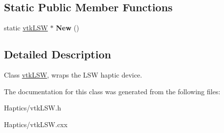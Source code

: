 \subsection*{Static Public Member Functions}
\begin{DoxyCompactItemize}
\item 
\hypertarget{classvtkLSW_a387712b4a9a6247add516701cf0be560}{
static \hyperlink{classvtkLSW}{vtkLSW} $\ast$ {\bfseries New} ()}
\label{classvtkLSW_a387712b4a9a6247add516701cf0be560}

\end{DoxyCompactItemize}


\subsection{Detailed Description}
Class \hyperlink{classvtkLSW}{vtkLSW}, wraps the LSW haptic device. 

The documentation for this class was generated from the following files:\begin{DoxyCompactItemize}
\item 
Haptics/vtkLSW.h\item 
Haptics/vtkLSW.cxx\end{DoxyCompactItemize}
